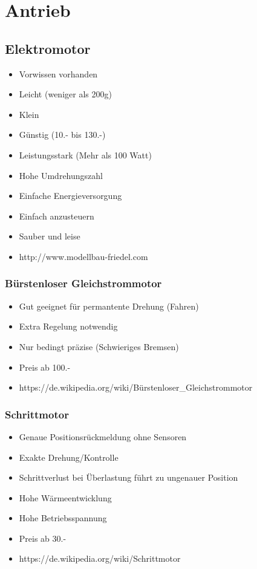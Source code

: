 \section{Antrieb}

\subsection{Elektromotor}
\begin{itemize}
\item Vorwissen vorhanden
\item Leicht (weniger als 200g)
\item Klein
\item Günstig (10.- bis 130.-)
\item Leistungsstark (Mehr als 100 Watt)
\item Hohe Umdrehungszahl
\item Einfache Energieversorgung
\item Einfach anzusteuern
\item Sauber und leise
\item http://www.modellbau-friedel.com
\end{itemize}

\subsubsection{Bürstenloser Gleichstrommotor}
\begin{itemize}
\item Gut geeignet für permantente Drehung (Fahren)
\item Extra Regelung notwendig
\item Nur bedingt präzise (Schwieriges Bremsen)
\item Preis ab 100.-
\item https://de.wikipedia.org/wiki/Bürstenloser_Gleichstrommotor
\end{itemize}

\subsubsection{Schrittmotor}
\begin{itemize}
\item Genaue Positionsrückmeldung ohne Sensoren
\item Exakte Drehung/Kontrolle
\item Schrittverlust bei Überlastung führt zu ungenauer Position
\item Hohe Wärmeentwicklung
\item Hohe Betriebsspannung
\item Preis ab 30.-
\item https://de.wikipedia.org/wiki/Schrittmotor
\end{itemize}


